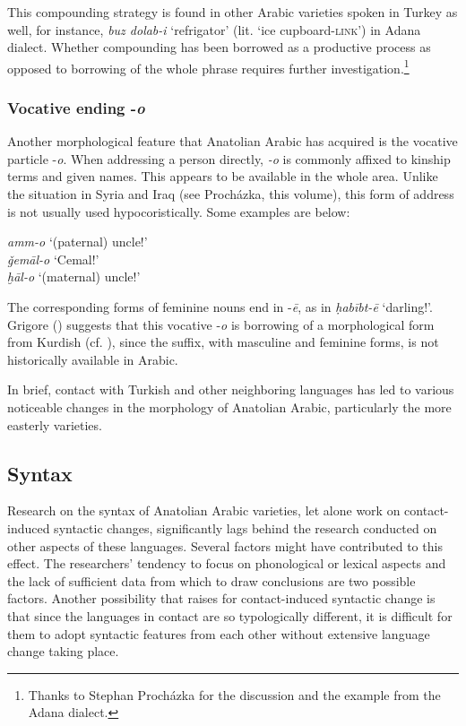 \documentclass[output=paper]{langsci/langscibook}
\begin{document}
\noindent This compounding strategy is found in other Arabic varieties spoken in Turkey as well, for instance, \textit{buz dolab-i} `refrigator' (lit. `ice cupboard-\textsc{link}') in Adana dialect. Whether compounding has been borrowed as a productive process as opposed to borrowing of the whole phrase requires further investigation.\footnote{Thanks to Stephan Proch\'{a}zka for the discussion and the example from the Adana dialect.}



\subsubsection{Vocative ending -\textit{o}}
Another morphological feature that Anatolian Arabic has acquired is the vocative particle -\textit{o}. When addressing a person directly, \textit{-o} is commonly affixed to kinship terms and given names. This appears to be available in the whole area. Unlike the situation in Syria and Iraq (see Proch\'{a}zka, this volume), this form of address is not usually used hypocoristically. Some examples are below:

\ea
\noindent \textit{amm-o} `(paternal) uncle!'\\
\textit{ǧem\={a}l-o} `Cemal!'\\
\textit{ḫāl-o} `(maternal) uncle!'\\
\z

\noindent The corresponding forms of feminine nouns end in -\textit{\={e}}, as in \textit{ḥabībt-ē} `darling!'. Grigore (\citeyear[203]{Grigore2007book}) suggests that this vocative -\textit{o} is borrowing of a morphological form from Kurdish (cf. \citealt{HaigÖpengin2018}), since the suffix, with masculine and feminine forms, is not historically available in Arabic.

In brief, contact with Turkish and other neighboring languages has led to various noticeable changes in the morphology of Anatolian Arabic, particularly the more easterly varieties. 

\subsection{Syntax}
Research on the syntax of Anatolian Arabic varieties, let alone work on contact-induced syntactic changes, significantly lags behind the research conducted on other aspects of these languages. Several factors might have contributed to this effect. The researchers' tendency to focus on phonological or lexical aspects and the lack of sufficient data from which to draw conclusions  are two possible factors. Another possibility that \cite{Ingham2005} raises for contact-induced syntactic change is that since the languages in contact are so typologically different, it is difficult for them to adopt syntactic features from each other without extensive language change taking place. 
\end{document}
